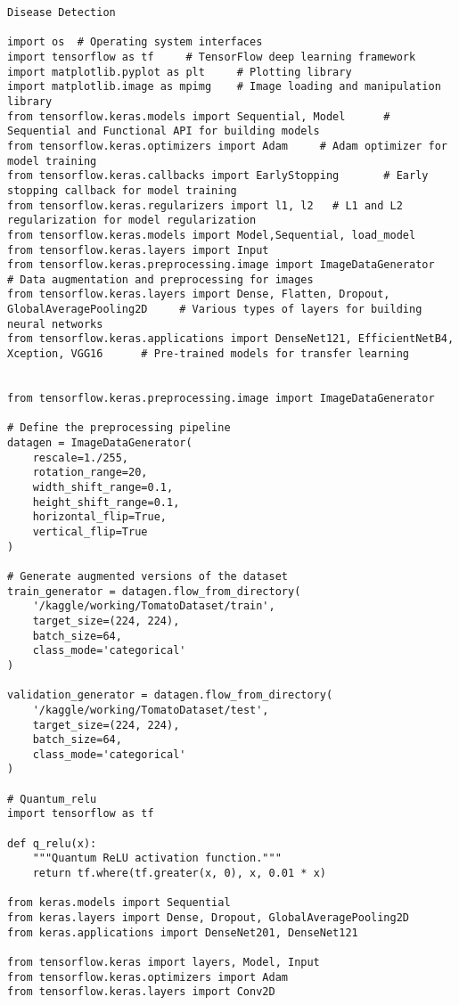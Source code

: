 \documentclass[12pt, English]{article}
\begin{document}
\begin{normalsize}
\begin{verbatim}
Disease Detection

import os  # Operating system interfaces
import tensorflow as tf     # TensorFlow deep learning framework
import matplotlib.pyplot as plt     # Plotting library
import matplotlib.image as mpimg    # Image loading and manipulation library
from tensorflow.keras.models import Sequential, Model      # Sequential and Functional API for building models
from tensorflow.keras.optimizers import Adam     # Adam optimizer for model training
from tensorflow.keras.callbacks import EarlyStopping       # Early stopping callback for model training
from tensorflow.keras.regularizers import l1, l2   # L1 and L2 regularization for model regularization
from tensorflow.keras.models import Model,Sequential, load_model
from tensorflow.keras.layers import Input
from tensorflow.keras.preprocessing.image import ImageDataGenerator    # Data augmentation and preprocessing for images
from tensorflow.keras.layers import Dense, Flatten, Dropout, GlobalAveragePooling2D     # Various types of layers for building neural networks
from tensorflow.keras.applications import DenseNet121, EfficientNetB4, Xception, VGG16      # Pre-trained models for transfer learning


from tensorflow.keras.preprocessing.image import ImageDataGenerator

# Define the preprocessing pipeline
datagen = ImageDataGenerator(
    rescale=1./255,
    rotation_range=20,
    width_shift_range=0.1,
    height_shift_range=0.1,
    horizontal_flip=True,
    vertical_flip=True
)

# Generate augmented versions of the dataset
train_generator = datagen.flow_from_directory(
    '/kaggle/working/TomatoDataset/train',
    target_size=(224, 224),
    batch_size=64,
    class_mode='categorical'
)

validation_generator = datagen.flow_from_directory(
    '/kaggle/working/TomatoDataset/test',
    target_size=(224, 224),
    batch_size=64,
    class_mode='categorical'
)

# Quantum_relu
import tensorflow as tf

def q_relu(x):
    """Quantum ReLU activation function."""
    return tf.where(tf.greater(x, 0), x, 0.01 * x)

from keras.models import Sequential
from keras.layers import Dense, Dropout, GlobalAveragePooling2D
from keras.applications import DenseNet201, DenseNet121

from tensorflow.keras import layers, Model, Input
from tensorflow.keras.optimizers import Adam
from tensorflow.keras.layers import Conv2D


\end{verbatim}
\end{normalsize}
\end{document}
